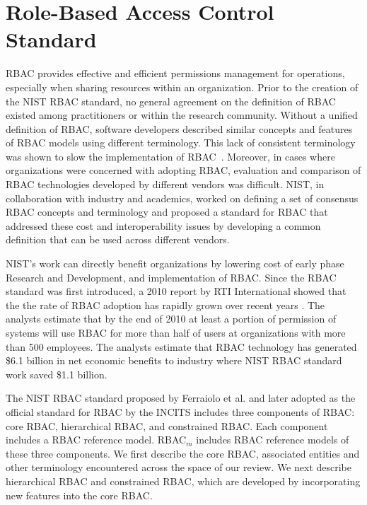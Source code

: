 \section{Role-Based Access Control Standard} \label{sec:core-rbac}

RBAC provides effective and efficient permissions management for operations, especially when sharing resources within an organization.
Prior to the creation of the NIST RBAC standard, no general agreement on the definition 
of RBAC existed among practitioners or within the research community. 
Without a unified definition of RBAC, software developers described similar concepts and features of RBAC models using different terminology. 
This lack of consistent terminology was shown to slow the implementation of RBAC~\cite{o20102010}.  
Moreover, in cases where organizations were concerned with adopting RBAC,
evaluation and comparison of RBAC technologies developed by different vendors was difficult.
NIST, in collaboration with industry and academics, worked on defining a set of consensus RBAC concepts and terminology and proposed a standard for 
RBAC that addressed these cost and interoperability issues by developing a common definition that can be used across different vendors.

NIST's work can directly benefit organizations by lowering cost of early phase Research and Development, and implementation of RBAC.
Since the RBAC standard was first introduced, a 2010 report by RTI International showed that the the rate of RBAC adoption has rapidly grown over recent years \cite{o20102010}. 
The analysts estimate that by the end of 2010 at least a portion of permission of systems will use RBAC for more than half of users at organizations with more than 500 employees. The analysts estimate that RBAC technology has generated \$6.1 billion in net economic benefits to industry where NIST RBAC standard work saved \$1.1 billion.

The NIST RBAC standard proposed by Ferraiolo et al. \cite{ferraiolo} and later adopted as the official standard for RBAC by the INCITS includes three components of RBAC: core RBAC, hierarchical RBAC, and constrained RBAC. Each component includes a RBAC reference model. RBAC$_{m}$ includes RBAC reference models of these three components. We first describe the core RBAC, associated entities and other terminology encountered across the space of our review. We next describe hierarchical RBAC and constrained RBAC, which are developed by incorporating new features into the core RBAC. 

